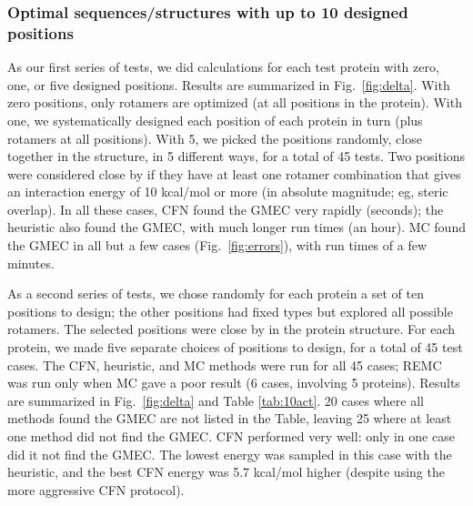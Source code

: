 {{\subsubsection{Optimal sequences/structures with up to 10 designed positions}
As our first series of tests, we did calculations for each test protein with zero, one, or five designed positions.
Results are summarized in Fig.\ \ref{fig:delta}. With zero positions, only rotamers are optimized (at all positions
in the protein). With one, we systematically designed each position of each protein in turn (plus rotamers at all
positions). With 5, we picked the positions randomly, close together in the structure, in 5 different ways, for a
total of 45 tests. Two positions were considered close by if they have at least one rotamer combination that gives
an interaction energy of 10 kcal/mol or more (in absolute magnitude; eg, steric overlap). In all these cases, CFN
found the GMEC very rapidly (seconds); the heuristic also found the GMEC, with much longer run times (an hour). MC
found the GMEC in all but a  few cases (Fig.\ \ref{fig:errors}), with run times of a few minutes. 

As a second series of tests, we chose randomly for each protein a set of ten positions to design; the other positions
had fixed types but explored all possible rotamers. The selected positions were close by in the protein structure. For
each protein, we made five separate choices of positions to design, for a total of 45 test cases. The CFN, heuristic,
and MC methods were run for all 45 cases; REMC was run only when MC gave a poor result (6 cases, involving 5 proteins).
Results are summarized in Fig.\ \ref{fig:delta} and Table \ref{tab:10act}. 20 cases where all methods found the GMEC
are not listed in the Table, leaving 25 where at least one method did not find the GMEC. CFN performed very well: only
in one case did it not find the GMEC. The lowest energy was sampled in this case with the heuristic, and the best CFN
energy was 5.7 kcal/mol higher (despite using the more aggressive CFN protocol). 

}}
